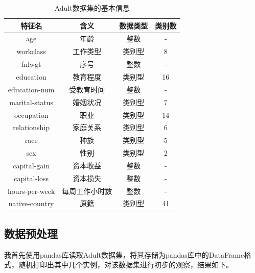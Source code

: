 \documentclass[12pt,a4paper]{article}
\theoremstyle{definition}
\begin{document}
\begin{table}[H]
	\renewcommand\arraystretch{1.15}
	\caption{Adult数据集的基本信息}
	\label{tab:feature-info}
	\centering
	
	\begin{tabular}{c|c|c|c}
		\centering
		 特征名 & 含义 & 数据类型 & 类别数 \\
		\hline
		\hline
		age & 年龄 & 整数 & - \\
		workclass & 工作类型 & 类别型 & 8 \\
		fnlwgt & 序号 & 整数 & - \\
		education & 教育程度 & 类别型 & 16 \\
		education-num & 受教育时间 & 整数 & - \\
		marital-status & 婚姻状况 & 类别型 & 7 \\
		occupation & 职业 & 类别型 & 14 \\
		relationship & 家庭关系 & 类别型 & 6 \\
		race & 种族 & 类别型 & 5 \\
		sex & 性别 & 类别型 & 2 \\
		capital-gain & 资本收益 & 整数 & - \\
		capital-loss & 	资本损失 & 整数 & - \\
		hours-per-week & 每周工作小时数 & 整数 & - \\
		native-country & 原籍 & 类别型 & 41 \\
		
	\end{tabular}
\end{table}

\subsection{数据预处理}

\vspace{0.01\linewidth}
我首先使用pandas库读取Adult数据集，将其存储为pandas库中的DataFrame格式，随机打印出其中几个实例，对该数据集进行初步的观察，结果如下。
\end{document}
